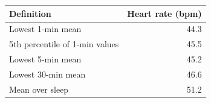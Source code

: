 \begin{tabular}{lr}
\toprule
Definition & Heart rate (bpm) \\
\midrule
Lowest 1-min mean & 44.3 \\
5th percentile of 1-min values & 45.5 \\
Lowest 5-min mean & 45.2 \\
Lowest 30-min mean & 46.6 \\
Mean over sleep & 51.2 \\
\bottomrule
\end{tabular}
